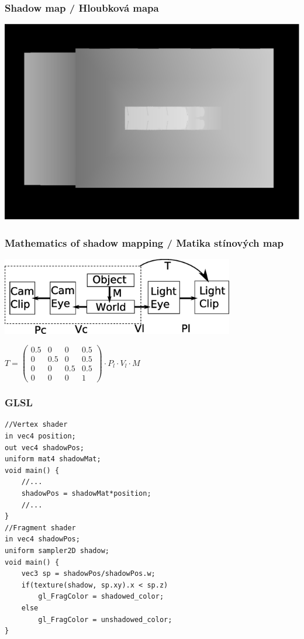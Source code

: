 \begin{frame}\frametitle{Shadow map / Hloubková mapa}
  \includegraphics[width=\textwidth]{pics/shadows/shadowMapping/depth.eps}
\end{frame}


\begin{frame}\frametitle{Mathematics of shadow mapping / Matika stínových map}
  \includegraphics[width=4in]{pics/shadows/shadowMapping/smspc.eps}
  
  \vfill

  $\displaystyle T = \left( \begin{array}{cccc}
      0.5 & 0   & 0   & 0.5 \\
      0   & 0.5 & 0   & 0.5 \\
      0   & 0   & 0.5 & 0.5 \\
      0   & 0   & 0   & 1 \end{array} \right) \cdot P_l \cdot V_l \cdot M$
\end{frame}

\begin{frame}[fragile]\frametitle{GLSL}\scriptsize
\begin{verbatim}
//Vertex shader
in vec4 position;
out vec4 shadowPos;
uniform mat4 shadowMat;
void main() {
    //...
    shadowPos = shadowMat*position;
    //...
}
//Fragment shader
in vec4 shadowPos;
uniform sampler2D shadow;
void main() {
    vec3 sp = shadowPos/shadowPos.w;
    if(texture(shadow, sp.xy).x < sp.z)
        gl_FragColor = shadowed_color;
    else
        gl_FragColor = unshadowed_color;
}
\end{verbatim}
\end{frame}

